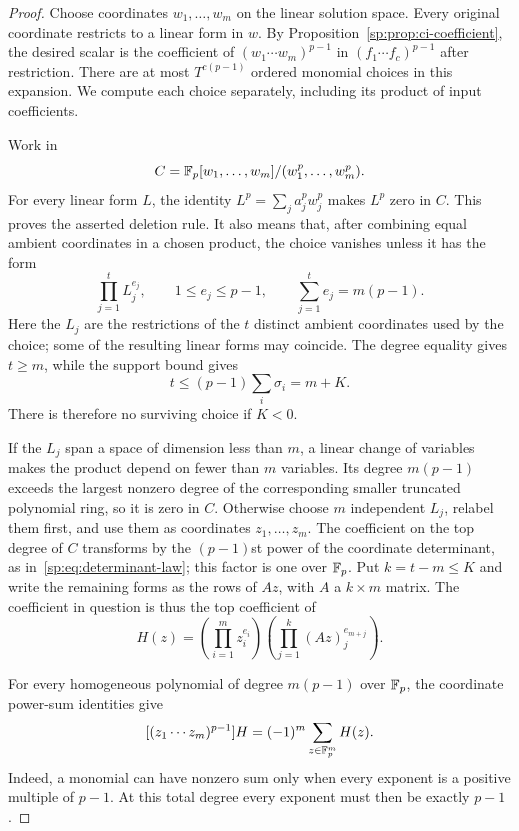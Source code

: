 \begin{proof}
Choose coordinates $w_1,\ldots,w_m$ on the linear solution space.
Every original coordinate restricts to a linear form in $w$.
By Proposition~\ref{sp:prop:ci-coefficient}, the desired scalar is
the coefficient of $(w_1\cdots w_m)^{p-1}$ in
$(f_1\cdots f_c)^{p-1}$ after restriction.
There are at most $T^{c(p-1)}$ ordered monomial choices in this
expansion. We compute each choice separately, including its product
of input coefficients.

Work in
\[
 C=\mathbb F_p[w_1,\ldots,w_m]/(w_1^p,\ldots,w_m^p).
\]
For every linear form $L$, the identity
$L^p=\sum_j a_j^p w_j^p$ makes $L^p$ zero in $C$.
This proves the asserted deletion rule. It also means that, after
combining equal ambient coordinates in a chosen product, the choice
vanishes unless it has the form
\[
 \prod_{j=1}^t L_j^{e_j},\qquad
 1\leq e_j\leq p-1,\qquad
 \sum_{j=1}^t e_j=m(p-1).
\]
Here the $L_j$ are the restrictions of the $t$ distinct ambient
coordinates used by the choice; some of the resulting linear forms
may coincide. The degree equality gives $t\geq m$, while the support
bound gives
\[
 t\leq(p-1)\sum_i\sigma_i=m+K.
\]
There is therefore no surviving choice if $K<0$.

If the $L_j$ span a space of dimension less than $m$, a linear change
of variables makes the product depend on fewer than $m$ variables.
Its degree $m(p-1)$ exceeds the largest nonzero degree of the
corresponding smaller truncated polynomial ring, so it is zero in
$C$. Otherwise choose $m$ independent $L_j$, relabel them first, and
use them as coordinates $z_1,\ldots,z_m$. The coefficient on the
top degree of $C$ transforms by the $(p-1)$st power of the coordinate
determinant, as in~\eqref{sp:eq:determinant-law}; this factor is one
over $\mathbb F_p$. Put $k=t-m\leq K$ and write the remaining forms as the
rows of $Az$, with $A$ a $k\times m$ matrix. The coefficient in
question is thus the top coefficient of
\[
 H(z)=\left(\prod_{i=1}^m z_i^{e_i}\right)
       \left(\prod_{j=1}^k (Az)_j^{e_{m+j}}\right).
\]

For every homogeneous polynomial of degree $m(p-1)$ over $\mathbb F_p$,
the coordinate power-sum identities give
\[
 [(z_1\cdots z_m)^{p-1}]H
   =(-1)^m\sum_{z\in\mathbb F_p^m} H(z).
\]
Indeed, a monomial can have nonzero sum only when every exponent
is a positive multiple of $p-1$. At this total degree every exponent
must then be exactly $p-1$.


\end{proof}
